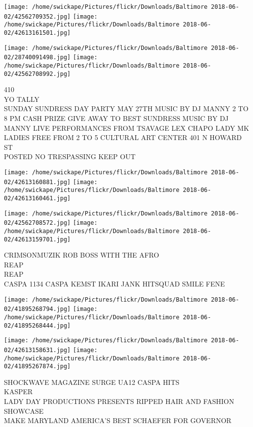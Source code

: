 \documentclass[10pt,letterpaper]{article}
\begin{document}
\texttt{[image: /home/swickape/Pictures/flickr/Downloads/Baltimore 2018-06-02/42562709352.jpg]}
\texttt{[image: /home/swickape/Pictures/flickr/Downloads/Baltimore 2018-06-02/42613161501.jpg]}

\texttt{[image: /home/swickape/Pictures/flickr/Downloads/Baltimore 2018-06-02/28740091498.jpg]}
\texttt{[image: /home/swickape/Pictures/flickr/Downloads/Baltimore 2018-06-02/42562708992.jpg]}

410\\
YO TALLY\\
SUNDAY SUNDRESS DAY PARTY MAY 27TH MUSIC BY DJ MANNY 2 TO 8 PM CASH PRIZE GIVE AWAY TO BEST SUNDRESS MUSIC BY DJ MANNY LIVE PERFORMANCES FROM TSAVAGE LEX CHAPO LADY MK LADIES FREE FROM 2 TO 5 CULTURAL ART CENTER 401 N HOWARD ST\\
POSTED NO TRESPASSING KEEP OUT\\
\pagebreak

\texttt{[image: /home/swickape/Pictures/flickr/Downloads/Baltimore 2018-06-02/42613160881.jpg]}
\texttt{[image: /home/swickape/Pictures/flickr/Downloads/Baltimore 2018-06-02/42613160461.jpg]}

\texttt{[image: /home/swickape/Pictures/flickr/Downloads/Baltimore 2018-06-02/42562708572.jpg]}
\texttt{[image: /home/swickape/Pictures/flickr/Downloads/Baltimore 2018-06-02/42613159701.jpg]}

CRIMSONMUZIK ROB BOSS WITH THE AFRO\\
REAP\\
REAP\\
CASPA 1134 CASPA KEMST IKARI JANK HITSQUAD SMILE FENE\\
\pagebreak

\texttt{[image: /home/swickape/Pictures/flickr/Downloads/Baltimore 2018-06-02/41895268794.jpg]}
\texttt{[image: /home/swickape/Pictures/flickr/Downloads/Baltimore 2018-06-02/41895268444.jpg]}

\texttt{[image: /home/swickape/Pictures/flickr/Downloads/Baltimore 2018-06-02/42613158631.jpg]}
\texttt{[image: /home/swickape/Pictures/flickr/Downloads/Baltimore 2018-06-02/41895267874.jpg]}

SHOCKWAVE MAGAZINE SURGE UA12 CASPA HITS\\
KASPER\\
LADY DAY PRODUCTIONS PRESENTS RIPPED HAIR AND FASHION SHOWCASE\\
MAKE MARYLAND AMERICA'S BEST SCHAEFER FOR GOVERNOR\\
\pagebreak
\end{document}
